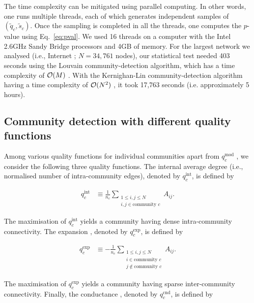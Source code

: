 \documentclass[fleqn,10pt]{wlscirep}
\def\qmod{q^{\text{mod}}}
\def\qint{q^{\text{int}}}
\def\qexp{q^{\text{exp}}}
\def\qcnd{q^{\text{cnd}}}
\begin{document}
The time complexity can be mitigated using parallel computing.
In other words, one runs multiple threads, each of which generates independent samples of $(\tilde q_{c}, \tilde s_{c})$.
Once the sampling is completed in all the threads, one computes the $p$-value using Eq.~\eqref{eq:pval}.
We used 16 threads on a computer with the Intel 2.6GHz Sandy Bridge processors and 4GB of memory.
For the largest network we analysed (i.e., Internet \cite{KONECT}; $N=34,761$ nodes), our statistical test needed 403 seconds using the Louvain community-detection algorithm, which has a time complexity of ${\cal O}(M)$ \cite{Blondel2008}.
With the Kernighan-Lin community-detection algorithm having a time complexity of ${\cal O}(N^2)$ \cite{Karrer2011}, it took 17,763 seconds (i.e. approximately 5 hours).

\subsection{Community detection with different quality functions}
\label{sec:community_detection}
Among various quality functions for individual communities apart from $\qmod_c$ \cite{Leskovec2010,Yang2015,Fortunato2016}, we consider the following three quality functions.
The internal average degree  \cite{Yang2015} (i.e., normalised number of intra-community edges), denoted by $\qint_c$, is defined by 
\begin{linenomath}
\begin{align}
    \qint _c &\equiv \frac{1}{n_c} \sum \limits _{{\substack{1 \leq i,j \leq N\\ i,j \in \text{community $c$}}}} A_{ij}. \label{eq:qint} 
\end{align}
\end{linenomath}
The maximisation of $\qint _c$ yields a community having dense intra-community connectivity. 
The expansion \cite{Yang2015}, denoted by $\qexp_c$, is defined by  
\begin{linenomath}
\begin{align}
    \qexp _c &\equiv - \frac{1}{n_c} \sum \limits _{{\substack{1 \leq i,j \leq N\\ i \in \text{community $c$}\\ j \notin \text{community $c$}}}} A_{ij}. \label{eq:qexp}
\end{align}
\end{linenomath}
The maximisation of $\qexp _c$ yields a community having sparse inter-community connectivity. 
Finally, the conductance \cite{Yang2015}, denoted by $\qcnd_c$, is defined by 
\end{document}
